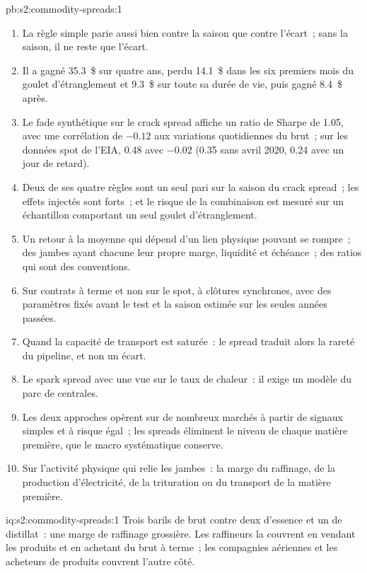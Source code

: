 \begin{solution}{pb:s2:commodity-spreads:1}
\begin{enumerate}
 3.8, 0.48, 0.01~;  2.6, 0.98, 0.01~; combinaison 1.69, $-0.13$.
\item La règle simple parie aussi bien contre la saison que contre l'écart~; sans la saison, il ne reste que l'écart.
\item Il a gagné 35.3~\$ sur quatre ans, perdu 14.1~\$ dans les six premiers mois du goulet d'étranglement et 9.3~\$ sur toute sa durée de vie, puis gagné 8.4~\$ après.
\item Le fade synthétique sur le crack spread affiche un ratio de Sharpe de 1.05, avec une corrélation de $-0.12$ aux variations quotidiennes du brut~; sur les données spot de l'EIA, 0.48 avec
$-0.02$ (0.35 sans avril 2020, 0.24 avec un jour de retard).
\item Deux de ses quatre règles sont un seul pari sur la saison du crack spread~; les effets injectés sont forts~; et le risque de la combinaison est mesuré sur un échantillon
comportant un seul goulet d'étranglement.
\item Un retour à la moyenne qui dépend d'un lien physique pouvant se rompre~; des jambes ayant chacune leur propre marge, liquidité et échéance~; des ratios qui sont des conventions.
\item Sur contrats à terme et non sur le spot, à clôtures synchrones, avec des paramètres fixés avant le test et la saison estimée sur les seules années passées.
\item Quand la capacité de transport est saturée~: le spread traduit alors la rareté du pipeline, et non un écart.
\item Le spark spread avec une vue sur le taux de chaleur~: il exige un modèle du parc de centrales.
\item Les deux approches opèrent sur de nombreux marchés à partir de signaux simples et à risque égal~; les spreads éliminent le niveau de chaque matière première, que le macro systématique conserve.
\item Sur l'activité physique qui relie les jambes~: la marge du raffinage, de la production d'électricité, de la trituration ou du transport de la matière première.
\end{enumerate}
\end{solution}

\begin{solution}{iq:s2:commodity-spreads:1}
Trois barils de brut contre deux d'essence et un de distillat~: une marge de raffinage grossière. Les raffineurs la couvrent en vendant les produits et en achetant du brut
à terme~; les compagnies aériennes et les acheteurs de produits couvrent l'autre côté.
\end{solution}

